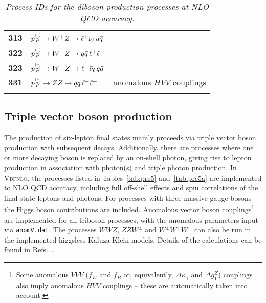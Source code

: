 \documentclass[english,12pt]{article}
\begin{document}
\begin{table}[t!]
\begin{center}
\begin{tabular}{c|l|l}
\bf 313 & $p \overset{\mbox{\tiny{(--)}}}{p} \to W^{+}Z \to  \ell^{+} \nu_{\ell} \, q \bar{q} $ \\
\bf 322 & $p \overset{\mbox{\tiny{(--)}}}{p} \to W^{-}Z \to q \bar{q} \, \ell^{+} \ell^{-} $  \\
\bf 323 & $p \overset{\mbox{\tiny{(--)}}}{p} \to W^{-}Z \to \ell^{-} \bar{\nu}_{\ell} \, q \bar{q} $  \\
\bf 331 & $p \overset{\mbox{\tiny{(--)}}}{p} \to ZZ \to q \bar{q} \, \ell^{-} \ell^{+} $ &  {anomalous $HVV$ couplings}\\
&\\
\hline
\end{tabular}
\caption {\em  Process IDs for the diboson production processes at NLO
  QCD accuracy.}
\vspace{0.2cm}
\label{tab:dib}
\end{center}
\end{table}

\subsection{Triple vector boson production}
\label{ssec:triboson}
The production of six-lepton final states mainly proceeds via triple vector
boson production with subsequent decays. Additionally, there are processes where
one or more decaying boson is replaced by an on-shell photon, giving rise to
lepton production in association with photon(s) and triple photon production. In
\textsc{Vbfnlo}, the processes listed in Tables~\ref{tab:prc5} and~\ref{tab:prc5a} are implemented to
NLO QCD accuracy, including full off-shell effects and spin correlations of the
final state leptons and photons. For processes with three massive gauge bosons
the Higgs boson contributions are included. Anomalous
vector boson couplings\footnote{Some anomalous $VVV$ ($f_{W}$ and $f_{B}$ or,
equivalently, $\Delta \kappa_{\gamma}$ and $\Delta g_{1}^{Z}$) couplings also
imply anomalous $HVV$ couplings -- these are automatically taken into account.}
are implemented for all triboson processes, with the anomalous parameters input via {\tt anomV.dat}. 
The processes $WWZ$, $ZZW^{\pm}$ and $W^{\pm}W^{+}W^{-}$ can also be run in the implemented higgsless
Kaluza-Klein models.  Details of the calculations can be found in
Refs.~\cite{Hankele:2007sb,Campanario:2008yg,Bozzi:2009ig,Bozzi:2010sj,
Bozzi:2011wwa,Bozzi:2011en}.  
\end{document}
